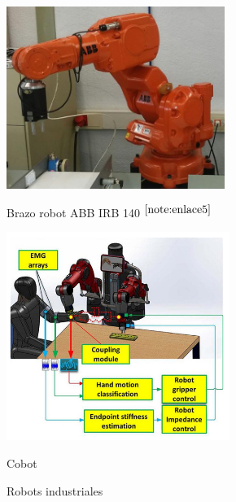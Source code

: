 \begin{figure}[ht!]
	\centering
	\begin{minipage}{0.44\linewidth}
		\centering
		\includegraphics[width=\linewidth]{figs/brazoIRB140.png}
		\caption*{\centering Brazo robot ABB IRB 140 $^{\ref{note:enlace5}}$}

	\end{minipage}
	\hspace{1cm}
	\begin{minipage}{0.4\linewidth}
		\centering
		\includegraphics[width=\linewidth]{figs/cobot.png}
		\caption*{\centering Cobot}
		
	\end{minipage}
	\caption{Robots industriales}
	\label{fig:robindustriales}
\end{figure}



